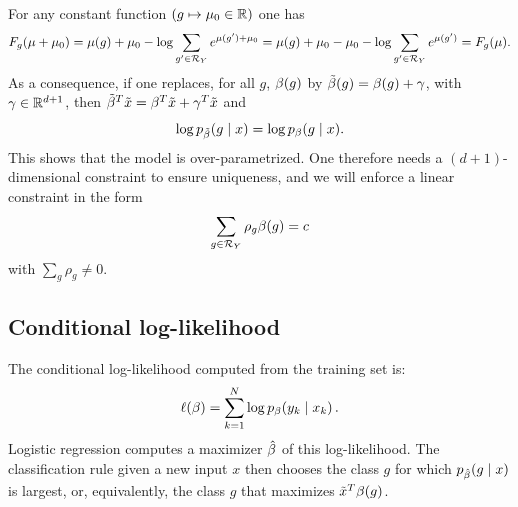 For any constant function $(g \mapsto \mu_0\in {\mathbb{R}})$ one has
\[
F_g(\mu+\mu_0) = \mu(g) +\mu_0 - \log \sum_{g'\in {\mathcal R}_Y} e^{\mu(g')+\mu_0} =  \mu(g) +\mu_0 - \mu_0 - \log \sum_{g'\in {\mathcal R}_Y} e^{\mu(g')} = F_g(\mu).
\]
As a consequence, if one replaces, for all $g$,  $\beta(g)$ by $\tilde {\beta}(g) = \beta(g) + \gamma$, with $\gamma\in {\mathbb{R}}^{d+1}$, then $\tilde \beta^T{\tilde{x}} = \beta^T{\tilde{x}} + \gamma^T{\tilde{x}}$ and
\[
\log p_{\tilde {\beta}}(g\mid x) =   \log p_{\beta}(g\mid x).
\]
This shows that the model is over-parametrized. 
 One therefore needs a $(d+1)$-dimensional constraint to ensure uniqueness, and we will enforce a linear constraint in the form
\[
\sum_{g\in {\mathcal R}_Y} \rho_g \beta(g) = c
\]
with $\sum_g\rho_g \neq 0$.



\subsection{Conditional log-likelihood}
The conditional log-likelihood computed from the training set is:
\[
\ell(\beta) = \sum_{k=1}^N \log p_\beta(y_k\mid x_k)\,.
\]
 Logistic regression computes a maximizer $\hat {\beta}$ of this log-likelihood.
 The classification rule given a new input $x$ then chooses the class $g$ for which $p_{\hat {\beta}}(g\mid x)$ is largest, or, equivalently, the class $g$ that maximizes ${\tilde{x}}^{T} \beta(g)$.
 
